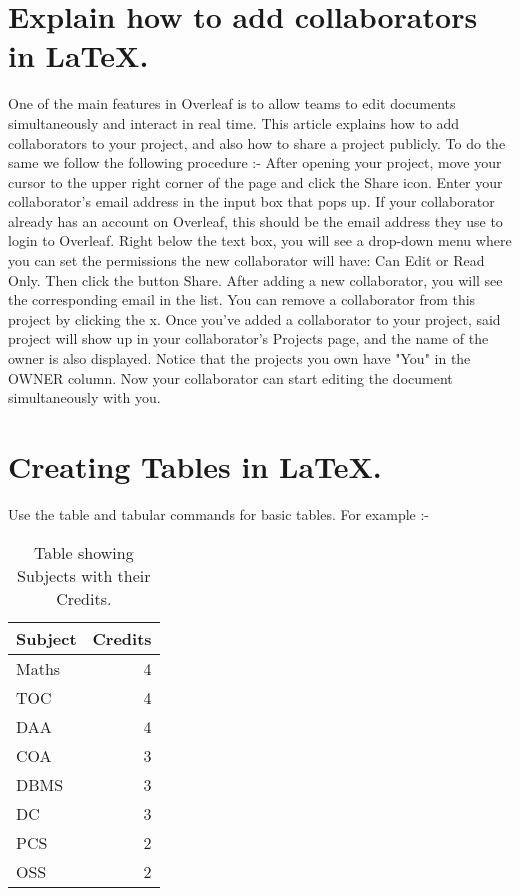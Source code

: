\documentclass[a4paper]{article}
\begin{document}
\section{Explain how to add collaborators in LaTeX.}
One of the main features in Overleaf is to allow teams to edit documents simultaneously and interact in real time. This article explains how to add collaborators to your project, and also how to share a project publicly.
To do the same we follow the following procedure :-
\newline
After opening your project, move your cursor to the upper right corner of the page and click the Share icon.
\newline
Enter your collaborator's email address in the input box that pops up. If your collaborator already has an account on Overleaf, this should be the email address they use to login to Overleaf. Right below the text box, you will see a drop-down menu where you can set the permissions the new collaborator will have: Can Edit or Read Only. Then click the button Share.
\newline
After adding a new collaborator, you will see the corresponding email in the list. You can remove a collaborator from this project by clicking the x.
\newline
Once you've added a collaborator to your project, said project will show up in your collaborator's Projects page, and the name of the owner is also displayed. Notice that the projects you own have "You" in the OWNER column. Now your collaborator can start editing the document simultaneously with you.
\section{Creating Tables in LaTeX.}
Use the table and tabular commands for basic tables. For example :-
\newline
\begin{table}[!h]
\centering
\begin{tabular}{l|r}
Subject & Credits \\\hline
Maths & 4 \\
TOC & 4 \\
DAA & 4 \\
COA & 3 \\
DBMS & 3 \\
DC & 3 \\
PCS & 2 \\
OSS & 2
\end{tabular}
\caption{\label{tab:widgets}Table showing Subjects with their Credits.}
\end{table}
\end{document}

